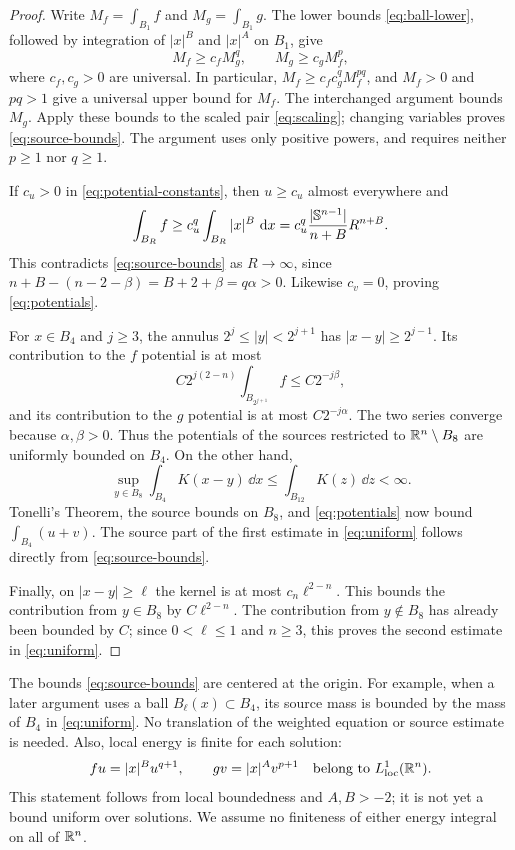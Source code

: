 \begin{proof}
Write $M_f=\int_{B_1}f$ and $M_g=\int_{B_1}g$.  The lower bounds
\eqref{eq:ball-lower}, followed by integration of $|x|^B$ and $|x|^A$
on $B_1$, give
\[
 M_f\ge c_fM_g^q,\qquad M_g\ge c_gM_f^p,
\]
where $c_f,c_g>0$ are universal.  In particular,
$M_f\ge c_fc_g^qM_f^{pq}$, and $M_f>0$ and $pq>1$ give a universal
upper bound for $M_f$.  The interchanged argument bounds $M_g$.
Apply these bounds to the scaled pair \eqref{eq:scaling}; changing
variables proves \eqref{eq:source-bounds}.  The argument uses only
positive powers, and requires neither $p\ge1$ nor $q\ge1$.

If $c_u>0$ in \eqref{eq:potential-constants}, then $u\ge c_u$ almost
everywhere and
\[
 \int_{B_R}f\ge c_u^q\int_{B_R}|x|^B\,\,\mathrm d x
 =c_u^q\frac{|\mathbb S^{n-1}|}{n+B}R^{n+B}.
\]
This contradicts \eqref{eq:source-bounds} as $R\to\infty$, since
$n+B-(n-2-\beta)=B+2+\beta=q\alpha>0$.
Likewise $c_v=0$, proving \eqref{eq:potentials}.

For $x\in B_4$ and $j\ge3$, the annulus
$2^j\le|y|<2^{j+1}$ has $|x-y|\ge2^{j-1}$.
Its contribution to the $f$ potential is at most
\[
 C2^{j(2-n)}\int_{B_{2^{j+1}}}f\le C2^{-j\beta},
\]
and its contribution to the $g$ potential is at most $C2^{-j\alpha}$.
The two series converge because $\alpha,\beta>0$.  Thus the potentials
of the sources restricted to $\mathbb R^n\setminus B_8$ are uniformly bounded
on $B_4$.  On the other hand,
\[
 \sup_{y\in B_8}\int_{B_4}K(x-y)\,\dd x
 \le\int_{B_{12}}K(z)\,\dd z<\infty.
\]
Tonelli's Theorem, the source bounds on $B_8$, and
\eqref{eq:potentials} now bound $\int_{B_4}(u+v)$.  The source part
of the first estimate in \eqref{eq:uniform} follows directly from
\eqref{eq:source-bounds}.

Finally, on $|x-y|\ge\ell$ the kernel is at most $c_n\ell^{2-n}$.
This bounds the contribution from $y\in B_8$ by $C\ell^{2-n}$.
The contribution from $y\notin B_8$ has already been bounded by $C$;
since $0<\ell\le1$ and $n\ge3$, this proves the second estimate in
\eqref{eq:uniform}.
\end{proof}

The bounds \eqref{eq:source-bounds} are centered at the origin.  For
example, when a later argument uses a ball $B_\ell(x)\subset B_4$, its
source mass is bounded by the mass of $B_4$ in \eqref{eq:uniform}.
No translation of the weighted equation or source estimate is needed.
Also, local energy is finite for each solution:
\[
 fu=|x|^Bu^{q+1},\qquad gv=|x|^Av^{p+1}
 \quad\hbox{belong to }L^1_{\mathrm{loc}}(\mathbb R^n).
\]
This statement follows from local boundedness and $A,B>-2$; it is not
yet a bound uniform over solutions.  We assume no finiteness of either
energy integral on all of $\mathbb R^n$.

